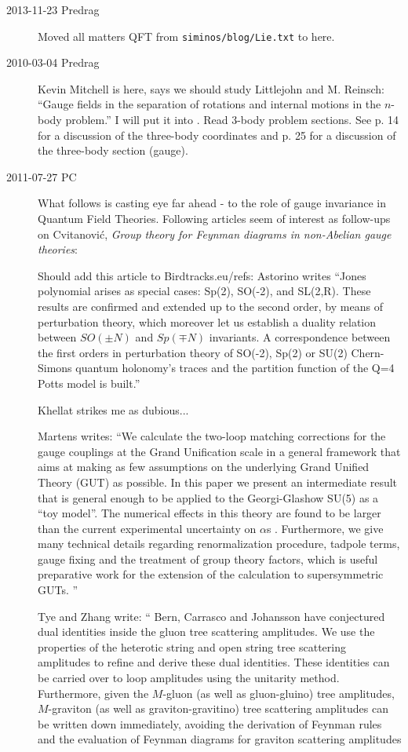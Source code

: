 \begin{description}
\item[2013-11-23  Predrag] Moved all matters QFT from
\texttt{siminos/blog/Lie.txt} to here.

\item[2010-03-04 Predrag]
Kevin Mitchell is here, says we should study Littlejohn and
M. Reinsch: ``Gauge fields in the separation of
rotations and internal motions in the $n$-body problem.'' I
will put it into . Read 3-body problem
sections. See p. 14 for a discussion of the three-body
coordinates and p. 25 for a discussion of the three-body
section (gauge).



\item[2011-07-27 PC]
What follows is casting eye far ahead - to the role of gauge invariance
in Quantum Field Theories.
Following articles seem of interest as follow-ups on
Cvitanovi\'c, {\em Group theory for {Feynman} diagrams in
non-{Abelian} gauge theories}:

Should add this article to Birdtracks.eu/refs: Astorino
writes ``Jones polynomial arises as special cases: Sp(2), SO(-2), and
SL(2,R). These results are confirmed and extended up to the second order,
by means of perturbation theory, which moreover let us establish a
duality relation between $SO(\pm N)$ and $Sp(\mp N)$ invariants. A
correspondence between the first orders in perturbation theory of SO(-2),
Sp(2) or SU(2) Chern-Simons quantum holonomy's traces and the partition
function of the Q=4 Potts model is built.''

Khellat strikes me as dubious...

Martens writes: ``We calculate the two-loop matching corrections for the
   gauge couplings at the Grand Unification scale in a general framework
   that aims at making as few assumptions on the underlying Grand Unified
   Theory (GUT) as possible. In this paper we present an intermediate
   result that is general enough to be applied to the Georgi-Glashow
   SU(5) as a ``toy model''. The numerical effects in this theory are
   found to be larger than the current experimental uncertainty on $\alpha$s .
   Furthermore, we give many technical details regarding renormalization
   procedure, tadpole terms, gauge fixing and the treatment of group
   theory factors, which is useful preparative work for the extension of
   the calculation to supersymmetric GUTs.
   ''

Tye and Zhang write: ``
Bern, Carrasco and Johansson have conjectured dual
   identities inside the gluon tree scattering amplitudes.
   We use the properties of the heterotic string and open string tree
   scattering amplitudes to refine and derive these dual identities.
   These identities can be carried over to loop amplitudes using the
   unitarity method. Furthermore, given the $M$-gluon (as well as
   gluon-gluino) tree amplitudes, $M$-graviton (as well as
   graviton-gravitino) tree scattering amplitudes can be written down
   immediately, avoiding the derivation of Feynman rules and the
   evaluation of Feynman diagrams for graviton scattering amplitudes


\end{description}
